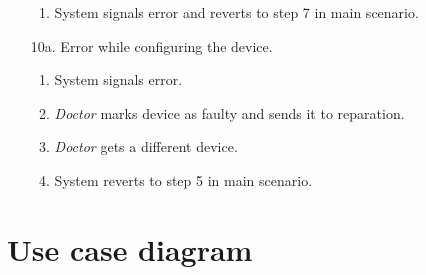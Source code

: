 \documentclass[fontsize=12pt,
               paper=a4,
               twoside=false,
               parskip=half,
               ]{scrartcl}
\begin{document}
\begin{itemize}[leftmargin=3em]
\begin{enumerate}
		\item System signals error and reverts to step 7 in main scenario.
	\end{enumerate}
	\item[10a.] Error while configuring the device.
	\begin{enumerate}
		\item System signals error.
		\item \emph{Doctor} marks device as faulty and sends it to reparation.
		\item \emph{Doctor} gets a different device.
		\item System reverts to step 5 in main scenario.
	\end{enumerate}
\end{itemize}

\section{Use case diagram}


\end{document}

